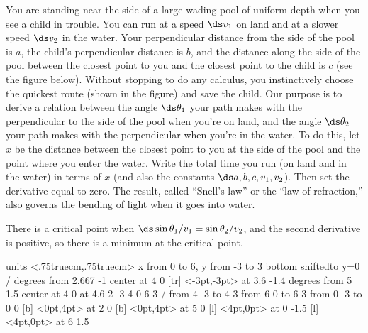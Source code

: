 \begin{exercises}
\exercise
You are standing near the side of a large wading pool of uniform depth when
you see a child in trouble.  You can run at a speed $\ds v_1$ on land and at a
slower speed $\ds v_2$ in the water.  Your perpendicular distance from the side
of the pool is $a$, the child's perpendicular distance is $b$, and the
distance along the side of the pool between the closest point to you and
the closest point to the child is $c$ (see the figure below). 
Without stopping to do any calculus, you instinctively choose the
quickest route (shown in the figure) and save the child.  Our
purpose is to derive a relation between the angle $\ds \theta_1$ your path
makes with the perpendicular to the side of the pool when you're on land,
and the angle $\ds \theta_2$ your path makes with the perpendicular when you're
in the water.  To do this, let $x$ be the distance between the closest
point to you at the side of the pool and the point where you enter the
water.  Write the total time you run (on land and in the water) in 
terms of $x$ (and also the constants $\ds a,b,c,v_1,v_2$).  Then set the
derivative equal to zero.  The result, called ``Snell's law'' or the ``law
of refraction,'' also governs the bending of light when it goes into water.
\begin{answer} There is a critical point when
$\ds \sin\theta_1/v_1=\sin\theta_2/v_2$, and the second derivative is
positive, so there is a minimum at the critical point.
\end{answer}

\figure
\vbox{\beginpicture
\normalgraphs
\ninepoint
\setcoordinatesystem units <.75truecm,.75truecm>
\setplotarea x from 0 to 6, y from -3 to 3
\axis bottom shiftedto y=0 /
 degrees from 2.667 -1 center at 4 0
 [tr] <-3pt,-3pt> at 3.6 -1.4
 degrees from 5 1.5 center at 4 0
 at 4.6 2
\setlinear
{} -3 4 0 6 3 /
\setdashes
\putrule from 4 -3 to 4 3
\putrule from 6 0 to 6 3
\putrule from 0 -3 to 0 0
 [b] <0pt,4pt> at 2 0
 [b] <0pt,4pt> at 5 0
 [l] <4pt,0pt> at 0 -1.5
 [l] <4pt,0pt> at 6 1.5
\endpicture}

\end{exercises}

